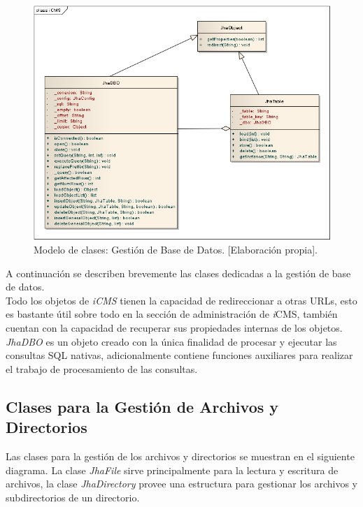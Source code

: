 \begin{figure}[h]
\centering
\includegraphics[scale=.5, keepaspectratio=true]{imagenes/06_imagen.png}
\caption{Modelo de clases: Gesti\'on de Base de Datos. [Elaboraci\'on propia].}
\end{figure}

A continuaci\'on se describen brevemente las clases dedicadas a la gesti\'on de base de datos.\\

Todo los objetos de \textit{iCMS} tienen la capacidad de redireccionar a otras URLs, esto es bastante \'util sobre todo en la secci\'on de administraci\'on de \textit{i}CMS, tambi\'en cuentan con la capacidad de recuperar sus propiedades internas de los objetos.\\



\emph{JhaDBO} es un objeto creado con la \'unica finalidad de procesar y ejecutar las consultas SQL nativas, adicionalmente contiene funciones auxiliares para realizar el trabajo de procesamiento de las consultas.



\subsection{Clases para la Gesti\'on de Archivos y Directorios}
Las clases para la gesti\'on de los archivos y directorios se muestran en el siguiente diagrama. La clase \textit{JhaFile} sirve principalmente para la lectura y escritura de archivos, la clase \textit{JhaDirectory} provee una estructura para gestionar los archivos y subdirectorios de un directorio.\\

